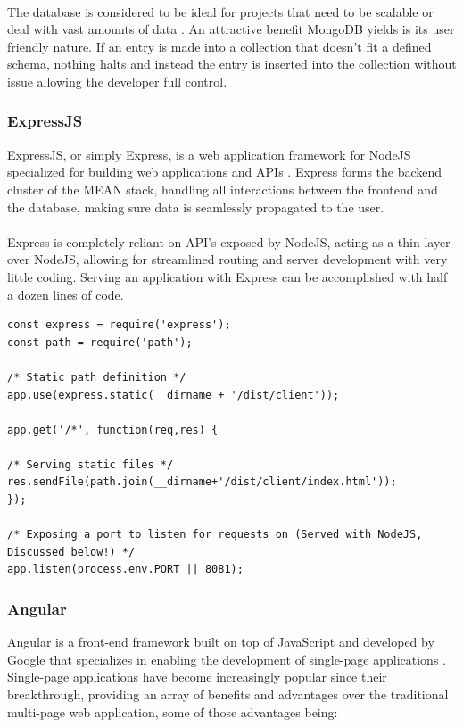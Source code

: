 \paragraph{}
The database is considered to be ideal for projects that need to be scalable or deal with vast amounts of data \cite{MONGODB}. An attractive benefit MongoDB yields is its user friendly nature. If an entry is made into a collection that doesn't fit a defined schema, nothing halts and instead the entry is inserted into the collection without issue allowing the developer full control.

\subsubsection{ExpressJS}
ExpressJS, or simply Express, is a web application framework for NodeJS specialized for building web applications and APIs \cite{EXPRESS}. Express forms the backend cluster of the MEAN stack, handling all interactions between the frontend and the database, making sure data is seamlessly propagated to the user. 

\paragraph{}
Express is completely reliant on API's exposed by NodeJS, acting as a thin layer over NodeJS, allowing for streamlined routing and server development with very little coding. Serving an application with Express can be accomplished with half a dozen lines of code.

\medskip
\begin{lstlisting}[caption=Serving with Express]
const express = require('express');
const path = require('path');

/* Static path definition */
app.use(express.static(__dirname + '/dist/client'));

app.get('/*', function(req,res) {

/* Serving static files */
res.sendFile(path.join(__dirname+'/dist/client/index.html'));
});

/* Exposing a port to listen for requests on (Served with NodeJS, Discussed below!) */
app.listen(process.env.PORT || 8081);

\end{lstlisting}

\subsubsection{Angular}
Angular is a front-end framework built on top of JavaScript and developed by Google that specializes in enabling the development of single-page applications \cite{ANGULAR}. Single-page applications have become increasingly popular since their breakthrough, providing an array of benefits and advantages over the traditional multi-page web application, some of those advantages being:

